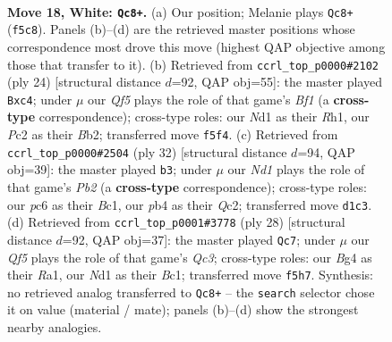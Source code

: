 \documentclass[11pt]{article}
\begin{document}
\clearpage

\begin{figure}[p]\centering
\begin{subfigure}{0.46\textwidth}\centering
\resizebox{\linewidth}{!}{%
\newchessgame
\chessboard[
  setfen={rn2kbnr/4q1p1/2p5/p2p1QP1/1p1P2Bp/7P/PPP2P2/R1BN1RK1 w - - 0 18},
  showmover=false,
  pgfstyle=straightmove, color=movearrow, markmove={f5-c8}
]}
\caption{}
\end{subfigure}\hfill
\begin{subfigure}{0.46\textwidth}\centering
\resizebox{\linewidth}{!}{%
\newchessgame
\chessboard[
  setfen={rn2k2r/1pqbnppp/p3p3/4P3/1PpQ4/P4N2/1B3PPP/R3KB1R w KQkq - 0 13},
  showmover=false,
  pgfstyle=straightmove, color=movearrow, markmove={f1-c4}
]}
\caption{}
\end{subfigure}
\\[4pt]
\begin{subfigure}{0.46\textwidth}\centering
\resizebox{\linewidth}{!}{%
\newchessgame
\chessboard[
  setfen={rr4k1/2pqb1p1/4pn1p/pp2p3/P3P3/2P4P/1PQN1PP1/R1B1R1K1 w - - 0 17},
  showmover=false,
  pgfstyle=straightmove, color=movearrow, markmove={b2-b3}
]}
\caption{}
\end{subfigure}\hfill
\begin{subfigure}{0.46\textwidth}\centering
\resizebox{\linewidth}{!}{%
\newchessgame
\chessboard[
  setfen={r1bqr1k1/1p3ppp/3P4/p2pn3/4p3/PPQ1P3/3P1PPP/R1B1KB1R w KQ - 0 15},
  showmover=false,
  pgfstyle=straightmove, color=movearrow, markmove={c3-c7}
]}
\caption{}
\end{subfigure}
\caption{\textbf{Move 18, White: \texttt{Qc8+}.} (a) Our position; Melanie plays \texttt{Qc8+} (\texttt{f5c8}). Panels (b)--(d) are the retrieved master positions whose correspondence most drove this move (highest QAP objective among those that transfer to it). (b) Retrieved from \texttt{ccrl\_top\_p0000\#2102} (ply 24) [structural distance $d$=92, QAP obj=55]: the master played \texttt{Bxc4}; under $\mu$ our \emph{Qf5} plays the role of that game's \emph{Bf1} (a \textbf{cross-type} correspondence); cross-type roles: our \emph{N}d1 as their \emph{R}h1, our \emph{P}c2 as their \emph{B}b2; transferred move \texttt{f5f4}. (c) Retrieved from \texttt{ccrl\_top\_p0000\#2504} (ply 32) [structural distance $d$=94, QAP obj=39]: the master played \texttt{b3}; under $\mu$ our \emph{Nd1} plays the role of that game's \emph{Pb2} (a \textbf{cross-type} correspondence); cross-type roles: our \emph{p}c6 as their \emph{B}c1, our \emph{p}b4 as their \emph{Q}c2; transferred move \texttt{d1c3}. (d) Retrieved from \texttt{ccrl\_top\_p0001\#3778} (ply 28) [structural distance $d$=92, QAP obj=37]: the master played \texttt{Qc7}; under $\mu$ our \emph{Qf5} plays the role of that game's \emph{Qc3}; cross-type roles: our \emph{B}g4 as their \emph{R}a1, our \emph{N}d1 as their \emph{B}c1; transferred move \texttt{f5h7}. Synthesis: no retrieved analog transferred to \texttt{Qc8+} -- the \texttt{search} selector chose it on value (material / mate); panels (b)--(d) show the strongest nearby analogies.}
\label{fig:thought-m34}
\end{figure}
\end{document}
